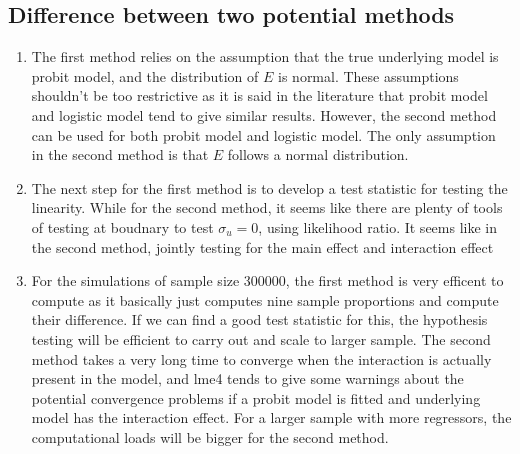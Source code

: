 \documentclass[]{article}
\begin{document}
\hypertarget{difference-between-two-potential-methods}{%
\subsection{Difference between two potential
methods}\label{difference-between-two-potential-methods}}

\begin{enumerate}
\item The first method relies on the assumption that the true underlying model is probit model, and the distribution of $E$ is normal. These assumptions shouldn't be too restrictive as it is said in the literature that probit model and logistic model tend to give similar results. However, the second method can be used for both probit model and logistic model. The only assumption in the second method is that $E$ follows a normal distribution.
\item The next step for the first method is to develop a test statistic for testing the linearity. While for the second method, it seems like there are plenty of tools of testing at boudnary to test $\sigma_u = 0$, using likelihood ratio. It seems like in the second method, jointly testing for the main effect and interaction effect 
\item For the simulations of sample size 300000, the first method is very efficent to compute as it basically just computes nine sample proportions and compute their difference. If we can find a good test statistic for this, the hypothesis testing will be efficient to carry out and scale to larger sample. The second method takes a very long time to converge when the interaction is actually present in the model, and lme4 tends to give some warnings about the potential convergence problems if a probit model is fitted and underlying model has the interaction effect. For a larger sample with more regressors, the computational loads will be bigger for the second method.

\end{enumerate}
\end{document}
